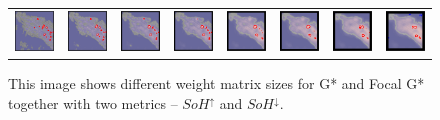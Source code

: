 \documentclass[a4paper,UKenglish]{lipics-v2016}
\begin{document}
\begin{figure}[htp]
\begin{tabular}{cccccccc}
    \includegraphics[width=4.6em]{images/gen-demo-blur-gstar-1}&
    \includegraphics[width=4.6em]{images/gen-demo-blur-gstar-2}&
    \includegraphics[width=4.6em]{images/gen-demo-blur-gstar-3}&
    \includegraphics[width=4.6em]{images/gen-demo-blur-gstar-4}&
    \includegraphics[width=4.6em]{images/gen-demo-blur-gstar-5}&
    \includegraphics[width=4.6em]{images/gen-demo-blur-gstar-6}&
    \includegraphics[width=4.6em]{images/gen-demo-blur-gstar-7}&
    \includegraphics[width=4.6em]{images/gen-demo-blur-gstar-8}\\
  \end{tabular}


  \caption{
    This image shows different weight matrix sizes for G* and Focal G* together 
    with two metrics -- $SoH^\uparrow$ and $SoH^\downarrow$.
  }
  \label{fig:Blur}
\end{figure}



\end{document}
